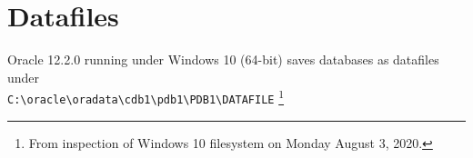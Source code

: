 
\newpage
\setcounter{secnumdepth}{0}
\section{Datafiles}

Oracle 12.2.0 running under Windows 10 (64-bit) saves databases as
datafiles under\\
 \texttt{C:\textbackslash oracle\textbackslash oradata\textbackslash cdb1\textbackslash pdb1\textbackslash PDB1\textbackslash DATAFILE}
\footnote{From inspection of Windows 10 filesystem on Monday August 3, 2020.}
